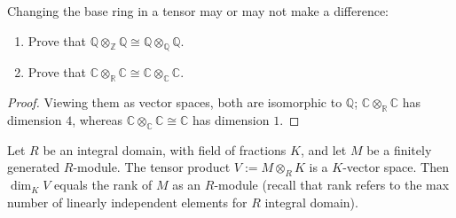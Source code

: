 \documentclass[openany]{book}
\newcommand{\R}{\mathbb{R}}
\newcommand{\C}{\mathbb{C}}
\newcommand{\Q}{\mathbb{Q}}
\begin{document}
\begin{prob}[2.7]
    Changing the base ring in a tensor may or may not make a difference:
    
    \begin{enumerate}
        \item Prove that \( \mathbb{Q} \otimes_{\mathbb{Z}} \mathbb{Q} \cong \mathbb{Q} \otimes_{\mathbb{Q}} \mathbb{Q} \).
        \item Prove that \( \mathbb{C} \otimes_{\mathbb{R}} \mathbb{C} \cong \mathbb{C} \otimes_{\mathbb{C}} \mathbb{C} \).
    \end{enumerate}
    \end{prob}
\begin{proof}
    Viewing them as vector spaces, both are isomorphic to $\Q$; $\C\otimes_\R\C$ has dimension $4$, whereas $\C\otimes_\C\C\cong\C$ has dimension $1$.
\end{proof}
    
    \begin{prop}[2.8]
    Let \( R \) be an integral domain, with field of fractions \( K \), and let \( M \) be a finitely generated \( R \)-module. The tensor product \( V := M \otimes_R K \) is a \( K \)-vector space. Then \(\dim_K V\) equals the rank of \( M \) as an \( R \)-module (recall that rank refers to the max number of linearly  independent elements for $R$ integral domain).
    \end{prop}
\end{document}
